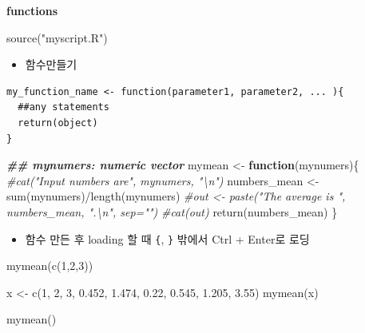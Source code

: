 \documentclass[
]{book}
\newenvironment{Shaded}{\begin{snugshade}}{\end{snugshade}}
\newcommand{\CommentTok}[1]{\textcolor[rgb]{0.56,0.35,0.01}{\textit{#1}}}
\newcommand{\ControlFlowTok}[1]{\textcolor[rgb]{0.13,0.29,0.53}{\textbf{#1}}}
\newcommand{\DecValTok}[1]{\textcolor[rgb]{0.00,0.00,0.81}{#1}}
\newcommand{\DocumentationTok}[1]{\textcolor[rgb]{0.56,0.35,0.01}{\textbf{\textit{#1}}}}
\newcommand{\FloatTok}[1]{\textcolor[rgb]{0.00,0.00,0.81}{#1}}
\newcommand{\FunctionTok}[1]{\textcolor[rgb]{0.00,0.00,0.00}{#1}}
\newcommand{\NormalTok}[1]{#1}
\newcommand{\OtherTok}[1]{\textcolor[rgb]{0.56,0.35,0.01}{#1}}
\newcommand{\SpecialCharTok}[1]{\textcolor[rgb]{0.00,0.00,0.00}{#1}}
\newcommand{\StringTok}[1]{\textcolor[rgb]{0.31,0.60,0.02}{#1}}
\providecommand{\tightlist}{%
  \setlength{\itemsep}{0pt}\setlength{\parskip}{0pt}}
\begin{document}
\textbf{functions}

\begin{Shaded}
\begin{Highlighting}[]
\FunctionTok{source}\NormalTok{(}\StringTok{"myscript.R"}\NormalTok{)}
\end{Highlighting}
\end{Shaded}

\begin{itemize}
\tightlist
\item
  함수만들기
\end{itemize}

\begin{verbatim}
my_function_name <- function(parameter1, parameter2, ... ){
  ##any statements
  return(object)
}
\end{verbatim}

\begin{Shaded}
\begin{Highlighting}[]

\DocumentationTok{\#\# mynumers: numeric vector}
\NormalTok{mymean }\OtherTok{\textless{}{-}} \ControlFlowTok{function}\NormalTok{(mynumers)\{}
  \CommentTok{\#cat("Input numbers are", mynumers, "\textbackslash{}n")}
\NormalTok{  numbers\_mean }\OtherTok{\textless{}{-}} \FunctionTok{sum}\NormalTok{(mynumers)}\SpecialCharTok{/}\FunctionTok{length}\NormalTok{(mynumers)}
  \CommentTok{\#out \textless{}{-} paste("The average is ", numbers\_mean, ".\textbackslash{}n", sep="")}
  \CommentTok{\#cat(out)}
  \FunctionTok{return}\NormalTok{(numbers\_mean)}
\NormalTok{\}}
\end{Highlighting}
\end{Shaded}

\begin{itemize}
\tightlist
\item
  함수 만든 후 loading 할 때 \texttt{\{}, \texttt{\}} 밖에서 Ctrl + Enter로 로딩
\end{itemize}

\begin{Shaded}
\begin{Highlighting}[]
\FunctionTok{mymean}\NormalTok{(}\FunctionTok{c}\NormalTok{(}\DecValTok{1}\NormalTok{,}\DecValTok{2}\NormalTok{,}\DecValTok{3}\NormalTok{))}

\NormalTok{x }\OtherTok{\textless{}{-}} \FunctionTok{c}\NormalTok{(}\DecValTok{1}\NormalTok{, }\DecValTok{2}\NormalTok{, }\DecValTok{3}\NormalTok{, }\FloatTok{0.452}\NormalTok{, }\FloatTok{1.474}\NormalTok{, }\FloatTok{0.22}\NormalTok{, }\FloatTok{0.545}\NormalTok{, }\FloatTok{1.205}\NormalTok{, }\FloatTok{3.55}\NormalTok{)}
\FunctionTok{mymean}\NormalTok{(x)}

\FunctionTok{mymean}\NormalTok{()}
\end{Highlighting}
\end{Shaded}
\end{document}
